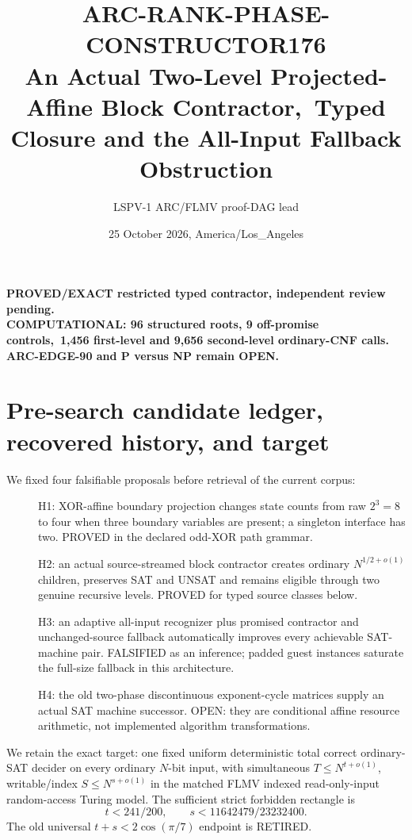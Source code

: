 \documentclass[11pt]{article}
\title{ARC-RANK-PHASE-CONSTRUCTOR176\\
\large An Actual Two-Level Projected-Affine Block Contractor,\
Typed Closure and the All-Input Fallback Obstruction}
\author{LSPV-1 ARC/FLMV proof-DAG lead}
\date{25 October 2026, America/Los\_Angeles}
\begin{document}
\maketitle
\begin{center}
\textbf{PROVED/EXACT restricted typed contractor, independent review pending.}\\
\textbf{COMPUTATIONAL: 96 structured roots, 9 off-promise controls,\
1,456 first-level and 9,656 second-level ordinary-CNF calls.}\\
\textbf{ARC-EDGE-90 and P versus NP remain OPEN.}
\end{center}
\section{Pre-search candidate ledger, recovered history, and target}
We fixed four falsifiable proposals before retrieval of the current corpus:
\begin{description}
\item[] H1: XOR-affine boundary projection changes state counts from raw
$2^3=8$ to four when three boundary variables are present; a singleton
interface has two. PROVED in the declared odd-XOR path grammar.
\item[] H2: an actual source-streamed block contractor creates ordinary
$N^{1/2+o(1)}$ children, preserves SAT and UNSAT and remains eligible
through two genuine recursive levels. PROVED for typed source classes below.
\item[] H3: an adaptive all-input recognizer plus promised contractor
and unchanged-source fallback automatically improves every achievable
SAT-machine pair. FALSIFIED as an inference; padded guest instances
saturate the full-size fallback in this architecture.
\item[] H4: the old two-phase discontinuous exponent-cycle matrices supply
an actual SAT machine successor. OPEN: they are conditional affine
resource arithmetic, not implemented algorithm transformations.
\end{description}
We retain the exact target: one fixed uniform deterministic total correct
ordinary-SAT decider on every ordinary $N$-bit input, with simultaneous
$T\le N^{t+o(1)}$, writable/index $S\le N^{s+o(1)}$ in the matched
FLMV indexed read-only-input random-access Turing model. The sufficient
strict forbidden rectangle is
\[
 t<241/200,\qquad s<11642479/23232400.
\]
The old universal $t+s<2\cos(\pi/7)$ endpoint is RETIRED.
\end{document}

